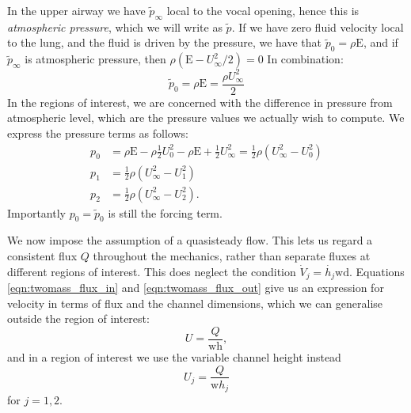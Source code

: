 In the upper airway we have $\tilde{p}_\infty$ local to the vocal opening,
hence this is \textit{atmospheric pressure}, which we will write as \({\tilde{p}}\).
If we have zero fluid velocity local to the lung, and the fluid is driven by the pressure,
we have that $\tilde{p}_0 = \rho \mathrm{E}$,
and if $\tilde{p}_\infty$ is atmospheric pressure, then $\rho(\mathrm{E} - U_\infty^2/2) = 0$
In combination:
\begin{equation}
    \tilde{p}_0 = \rho \mathrm{E} = \frac{\rho U_\infty^2}{2}
\end{equation}
In the regions of interest, we are concerned with the difference in pressure from atmospheric level,
which are the pressure values we actually wish to compute.
We express the pressure terms as follows:
\begin{equation}
    \begin{aligned}
        p_0 &= \rho\mathrm{E} - \rho\frac{1}{2}U_0^2 - \rho\mathrm{E} + \frac{1}{2}U_\infty^2 = \frac{1}{2}\rho\left(U_\infty^2 - U_0^2\right) \\
        p_1 &= \frac{1}{2}\rho\left(U_\infty^2 - U_1^2\right) \\
        p_2 &= \frac{1}{2}\rho\left(U_\infty^2 - U_2^2\right).
    \end{aligned}
\end{equation}
Importantly \(p_0 = \tilde{p}_0\) is still the forcing term.


We now impose the assumption of a quasisteady flow.
This lets us regard a consistent flux $Q$ throughout the mechanics,
rather than separate fluxes at different regions of interest.
This does neglect the condition $\dot{V}_j = \dot{h_j}\mathrm{wd}$.
Equations \ref{eqn:twomass_flux_in} and \ref{eqn:twomass_flux_out} give us an expression for velocity in terms of flux and the channel dimensions,
which we can generalise outside the region of interest:
\begin{equation}
    U = \frac{Q}{\mathrm{wh}},
\end{equation}
and in a region of interest we use the variable channel height instead
\begin{equation}
    U_j = \frac{Q}{\mathrm{w}h_j}
\end{equation}
for \(j=1,2\).

